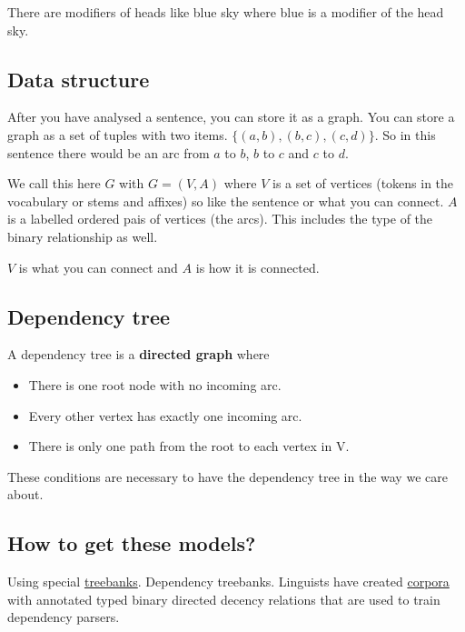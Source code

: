 \documentclass[
  11pt,
  british,
]{article}
\providecommand{\tightlist}{%
  \setlength{\itemsep}{0pt}\setlength{\parskip}{0pt}}
\begin{document}
There are modifiers of heads like blue sky where blue is a modifier of
the head sky.

\hypertarget{data-structure}{%
\subsection{Data structure}\label{data-structure}}

After you have analysed a sentence, you can store it as a graph. You can
store a graph as a set of tuples with two items.
\(\{(a,b), (b,c), (c,d)\}\). So in this sentence there would be an arc
from \(a\) to \(b\), \(b\) to \(c\) and \(c\) to \(d\).

We call this here \(G\) with \(G = (V,A)\) where \(V\) is a set of
vertices (tokens in the vocabulary or stems and affixes) so like the
sentence or what you can connect. \(A\) is a labelled ordered pais of
vertices (the arcs). This includes the type of the binary relationship
as well.

\(V\) is what you can connect and \(A\) is how it is connected.

\hypertarget{dependency-tree}{%
\subsection{Dependency tree}\label{dependency-tree}}

A dependency tree is a \textbf{directed graph} where

\begin{itemize}
\tightlist
\item
  There is one root node with no incoming arc.
\item
  Every other vertex has exactly one incoming arc.
\item
  There is only one path from the root to each vertex in V.
\end{itemize}

These conditions are necessary to have the dependency tree in the way we
care about.

\hypertarget{how-to-get-these-models}{%
\subsection{How to get these models?}\label{how-to-get-these-models}}

Using special \href{../Data/Treebank.md}{treebanks}. Dependency
treebanks. Linguists have created \href{../Data/Corpus.md}{corpora} with
annotated typed binary directed decency relations that are used to train
dependency parsers.
\end{document}
